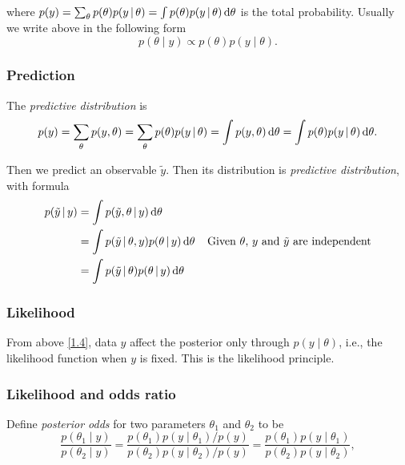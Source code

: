 \documentclass[11pt,a4paper]{article}
\begin{document}
where \(p(y)=\sum_\theta p(\theta)p(y\,|\, \theta)=\int p(\theta)p(y\,|\, \theta) \,\mathrm{d}\theta\) is the total probability. Usually we write above in the following form
\begin{equation}\label{1.2}
    p(\theta\mid y)\propto p(\theta)p(y\mid\theta).
\end{equation}

\subsubsection*{Prediction}

The \emph{ predictive distribution} is 
\begin{equation}\label{1.3}
    p(y)=\sum_\theta p(y,\theta)= \sum_\theta p(\theta)p(y\,|\, \theta)=\int p(y,\theta)\,\mathrm{d}\theta=\int p(\theta)p(y\,|\, \theta) \,\mathrm{d}\theta.
\end{equation}

Then we predict an observable \(\tilde{ y}\). Then its distribution is \emph{ predictive distribution}, with formula
\begin{align}
    p(\tilde{y}\,|\, y) &=\int p(\tilde y,\theta\,|\, y)\,\mathrm{d} \theta\nonumber\\
    &=\int p(\tilde{y}\,|\,\theta,y)p(\theta\,|\, y)\,\mathrm{d}\theta\;\;\;\;\textrm{Given $\theta$, $y$ and $\tilde y$ are independent}\nonumber\\
    &=\int p(\tilde{y}\,|\, \theta)p(\theta\,|\, y)\,\mathrm{d}\theta\label{1.4}
\end{align}

\subsubsection*{Likelihood}

From above \ref{1.4}, data \(y\) affect the posterior only through \(p(y\mid\theta)\), i.e., the likelihood function when \(y\) is fixed. This is the likelihood principle.

\subsubsection*{Likelihood and odds ratio}

Define \emph{posterior odds} for two parameters \(\theta_1\) and \(\theta_2\) to be 
\begin{equation}\label{1.5}
    \frac{p(\theta_1\mid y)}{p(\theta_2\mid y)}=\frac{p(\theta_1)p(y\mid\theta_1)/p(y)}{p(\theta_2)p(y\mid\theta_2)/p(y)}=\frac{p(\theta_1)p(y\mid\theta_1)}{p(\theta_2)p(y\mid\theta_2)},
\end{equation}
\end{document}
